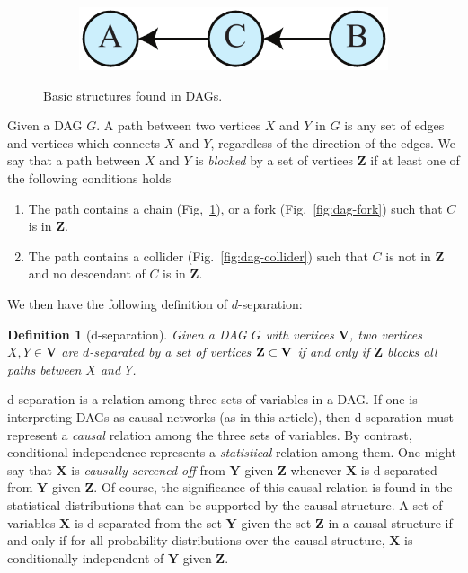 \documentclass[letterpaper,onecolumn,nofootinbib]{revtex4}
\newtheorem{definition}[theorem]{Definition}
\def\indep{\perp\!\!\!\!\perp}
\begin{document}
\begin{appendix}
\begin{figure}[h]
\begin{subfigure}[b]{0.18\textwidth}
		\vspace{1em}
		\includegraphics[width=\textwidth]{markovchain2}
		\label{fig:dag-chain}
	\end{subfigure}
        \caption{Basic structures found in DAGs.}
        \label{fig:dag-elts}
\end{figure}

Given a DAG $G$. A path between two vertices $X$ and $Y$ in $G$ is any set of edges and vertices which connects $X$ and $Y$, regardless of the direction of the edges. We say that a path between $X$ and $Y$ is \emph{blocked} by a set of vertices $\mathbf{Z}$ if at least one of the following conditions holds

\begin{enumerate}
\item The path contains a chain (Fig,~\ref{fig:dag-chain}), or a fork (Fig.~\ref{fig:dag-fork}) such that $C$ is in $\mathbf{Z}$.
\item The path contains a collider (Fig.~\ref{fig:dag-collider}) such that $C$ is not in $\mathbf{Z}$ and no descendant of $C$ is in $\mathbf{Z}$.
\end{enumerate}


We then have the following definition of $d$-separation:

\begin{definition}[d-separation]
Given a DAG $G$ with vertices $\textbf{V}$, two vertices $X,Y\in \mathbf{V}$ are $d$-separated by a set of vertices ${\bf Z} \subset \mathbf{V}$
  if and only if $\mathbf{Z}$ blocks all paths between $X$ and $Y$.
\end{definition}


d-separation is a relation among three sets of variables in a DAG.  If one is interpreting DAGs as causal networks (as in this article), then d-separation must represent a \emph{causal} relation among the three sets of variables.  By contrast, conditional independence represents a \emph{statistical} relation among them.  One might say that $\mathbf{X}$ is \emph{causally screened off} from $\mathbf{Y}$ given $\mathbf{Z}$ whenever $\mathbf{X}$ is d-separated from $\mathbf{Y}$ given $\mathbf{Z}$.  Of course, the significance of this causal relation is found in the statistical distributions that can be supported by the causal structure.  A set of variables $\mathbf{X}$ is d-separated from the set $\mathbf{Y}$ given the set $\mathbf{Z}$ in a causal structure if and only if for all probability distributions over the causal structure, $\mathbf{X}$ is conditionally independent of $\mathbf{Y}$ given $\mathbf{Z}$.


\end{appendix}
\end{document}
